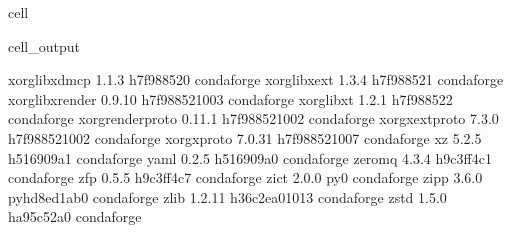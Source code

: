 \documentclass[letterpaper,table,10pt,english]{jupyterBook}
\begin{document}
\begin{sphinxuseclass}{cell}
\begin{sphinxVerbatimOutput}
\begin{sphinxuseclass}{cell_output}
\begin{sphinxVerbatim}[commandchars=\\\{\}]
xorg\PYGZhy{}libxdmcp             1.1.3                h7f98852\PYGZus{}0    conda\PYGZhy{}forge
xorg\PYGZhy{}libxext              1.3.4                h7f98852\PYGZus{}1    conda\PYGZhy{}forge
xorg\PYGZhy{}libxrender           0.9.10            h7f98852\PYGZus{}1003    conda\PYGZhy{}forge
xorg\PYGZhy{}libxt                1.2.1                h7f98852\PYGZus{}2    conda\PYGZhy{}forge
xorg\PYGZhy{}renderproto          0.11.1            h7f98852\PYGZus{}1002    conda\PYGZhy{}forge
xorg\PYGZhy{}xextproto            7.3.0             h7f98852\PYGZus{}1002    conda\PYGZhy{}forge
xorg\PYGZhy{}xproto               7.0.31            h7f98852\PYGZus{}1007    conda\PYGZhy{}forge
xz                        5.2.5                h516909a\PYGZus{}1    conda\PYGZhy{}forge
yaml                      0.2.5                h516909a\PYGZus{}0    conda\PYGZhy{}forge
zeromq                    4.3.4                h9c3ff4c\PYGZus{}1    conda\PYGZhy{}forge
zfp                       0.5.5                h9c3ff4c\PYGZus{}7    conda\PYGZhy{}forge
zict                      2.0.0                      py\PYGZus{}0    conda\PYGZhy{}forge
zipp                      3.6.0              pyhd8ed1ab\PYGZus{}0    conda\PYGZhy{}forge
zlib                      1.2.11            h36c2ea0\PYGZus{}1013    conda\PYGZhy{}forge
zstd                      1.5.0                ha95c52a\PYGZus{}0    conda\PYGZhy{}forge
\end{sphinxVerbatim}

\end{sphinxuseclass}\end{sphinxVerbatimOutput}

\end{sphinxuseclass}
\end{document}
